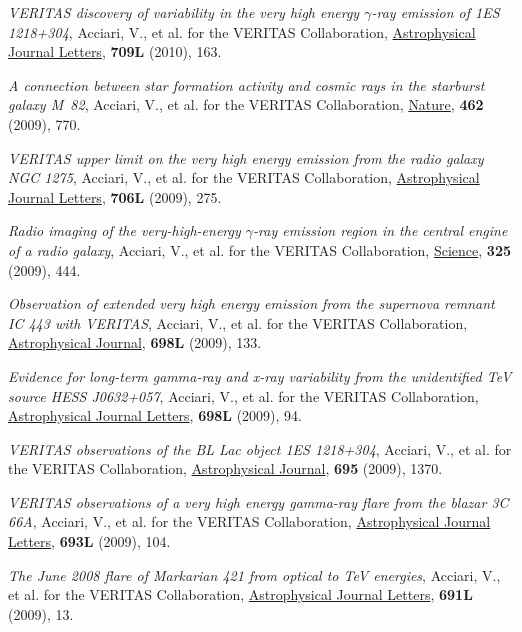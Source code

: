 \documentclass[9pt]{article}
\newcommand{\blankline}{\quad\pagebreak[2]}
\begin{document}
{\textit{VERITAS discovery of variability in the very high energy $\gamma$-ray emission of 1ES 1218+304}, Acciari, V., et al. for the VERITAS Collaboration, \underline{Astrophysical Journal Letters}, \textbf{709L} (2010), 163.

\blankline{}

\textit{A connection between star formation activity and cosmic rays in the starburst galaxy M~82}, Acciari, V., et al. for the VERITAS Collaboration, \underline{Nature}, \textbf{462} (2009), 770.

\blankline{}


\textit{VERITAS upper limit on the very high energy emission from the radio galaxy NGC 1275}, Acciari, V., et al. for the VERITAS Collaboration, \underline{Astrophysical Journal Letters}, \textbf{706L} (2009), 275. 

\blankline{}

\textit{Radio imaging of the very-high-energy $\gamma$-ray emission region in the central engine of a radio galaxy}, Acciari, V., et al. for the VERITAS Collaboration, \underline{Science}, \textbf{325} (2009), 444.


\blankline{}

\textit{Observation of extended very high energy emission from the supernova remnant IC 443 with VERITAS}, Acciari, V., et al. for the VERITAS Collaboration, \underline{Astrophysical Journal}, \textbf{698L} (2009), 133.

\blankline{}


\textit{Evidence for long-term gamma-ray and x-ray variability from the unidentified TeV source HESS J0632+057}, Acciari, V., et al. for the VERITAS Collaboration, \\\underline{Astrophysical Journal Letters}, \textbf{698L} (2009), 94.

\blankline{}


\textit{VERITAS observations of the BL Lac object 1ES 1218+304}, Acciari, V., et al. for the VERITAS Collaboration, \underline{Astrophysical Journal}, \textbf{695} (2009), 1370.

\blankline{}

\textit{VERITAS observations of a very high energy gamma-ray flare from the blazar 3C 66A}, Acciari, V., et al. for the VERITAS Collaboration, \underline{Astrophysical Journal Letters}, \textbf{693L} (2009), 104.

\blankline{}

\textit{The June 2008 flare of Markarian 421 from optical to TeV energies}, Acciari, V., et al. for the VERITAS Collaboration, \underline{Astrophysical Journal Letters}, \textbf{691L} (2009), 13.

}
\end{document}
